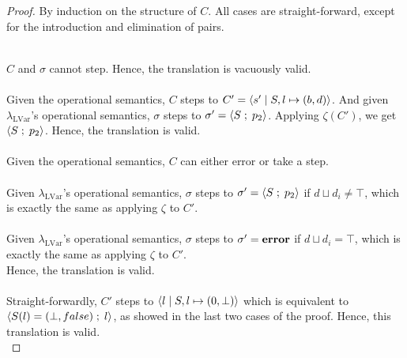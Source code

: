 \documentclass[main.tex]{subfiles}
\begin{document}
\begin{proof}
  By induction on the structure of $C$. All cases are straight-forward, except
  for the introduction and elimination of pairs.

 \\
 $C$ and $\sigma$ cannot step. Hence, the translation is vacuously valid.\\


 \\
  Given the operational semantics, $C$ steps to $C' = \langle {s'}\;\vert\;{S, l \mapsto (b,
    d)} \rangle$.
  And given $\lambda_{\text{LVar}}$'s operational semantics, $\sigma$ steps to
  $\sigma' = \langle {S} \; ; \;{p_2} \rangle$. Applying $\zeta (C')$, we get
  $\langle {S} \; ; \;{p_2} \rangle$. Hence, the translation is valid. \\


  \\
  Given the operational semantics, $C$ can either error or take a step.\\

     \\
    Given $\lambda_{\text{LVar}}$'s operational semantics, $\sigma$ steps to
    $\sigma' = \langle {S} \; ; \;{p_2} \rangle$ if $d \sqcup d_{i} \neq \top$, which is exactly
    the same as applying $\zeta$ to $C'$. \\
    

    \\
     Given $\lambda_{\text{LVar}}$'s operational semantics, $\sigma$ steps to
    $\sigma' = \mathbf{error}$ if $d \sqcup d_{i} = \top$, which is exactly
    the same as applying $\zeta$ to $C'$. \\

    Hence, the translation is valid. \\


  \\
  Straight-forwardly, $C'$ steps to $\langle {l}\;\vert\;{S, l \mapsto (0, \bot)} \rangle$ which
  is equivalent to $\langle {S(l) = (\bot, false)} \; ; \;{l} \rangle$, as showed in the last two
  cases of the proof. Hence, this translation is valid.  \\
  

\end{proof}
\end{document}
